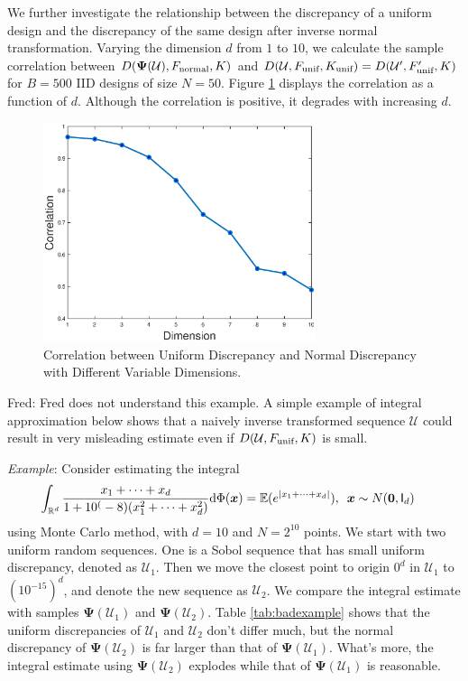 \documentclass[graybox]{svmult}
\newcommand{\vx}{\boldsymbol{x}}
\newcommand{\vPsi}{\boldsymbol{\Psi}}
\newcommand{\dif}{{\rm d}}
\newcommand{\Udes}{\mathcal{U}}
\newcommand{\Ex}{\mathbb{E}}
\newcommand{\unif}{\textup{unif}}
\newcommand{\normal}{\textup{normal}}
\newcommand{\FJH}[1]{{\color{blue}Fred: #1}}
\begin{document}
We further investigate the relationship between the discrepancy of a uniform design and the  discrepancy of the same design after inverse normal transformation.
Varying the dimension $d$ from $1$ to $10$, we calculate the sample correlation between $D(\vPsi(\Udes),F_\normal, K)$ and $D(\Udes,F_\unif,K_\unif) = D(\Udes',F_\unif',K)$ for $B=500$ IID designs of size $N=50$.  Figure \ref{fig:DiscVsd} displays the correlation as a function of $d$. Although the correlation is positive, it degrades with increasing $d$.

\begin{figure}[ht]
\begin{center}
\includegraphics[width=8cm]{code/dimVsdisc.eps}
\caption{Correlation between Uniform Discrepancy and Normal Discrepancy with Different Variable Dimensions. \label{fig:DiscVsd}}
\end{center}
\end{figure}

\FJH{Fred does not understand this example.}
A simple example of integral approximation below shows that a naively inverse transformed sequence $\Udes$ could result in very misleading estimate even if $D(\Udes,F_\unif, K)$ is small.

\emph{Example}: Consider estimating the integral
\begin{align}\label{eq:badexample}
\int_{\mathbb{R}^d} \frac{x_1+\cdots+x_d}{1+10^(-8)(x_1^2+\cdots+x_d^2)}\dif \Phi(\vx) & = \Ex(e^{|x_1+\cdots+x_d|}),\,\,\,\vx\sim N({\bf 0}, {\mathsf I}_d)
\end{align}
using Monte Carlo method, with $d=10$ and $N=2^{10}$ points. We start with two uniform random sequences. One is a Sobol sequence that has small uniform discrepancy, denoted as $\Udes_1$. Then we move the closest point to origin $0^d$ in $\Udes_1$ to $\left(10^{-15}\right)^d$, and denote the new sequence as $\Udes_2$. We compare the integral estimate with samples $\vPsi(\Udes_1)$ and $\vPsi(\Udes_2)$. Table \ref{tab:badexample} shows that the uniform discrepancies of $\Udes_1$ and $\Udes_2$ don't differ much, but the normal discrepancy of $\vPsi(\Udes_2)$ is far larger than that of $\vPsi(\Udes_1)$. What's more, the integral estimate using $\vPsi(\Udes_2)$ explodes while that of $\vPsi(\Udes_1)$ is reasonable. 
\end{document}
